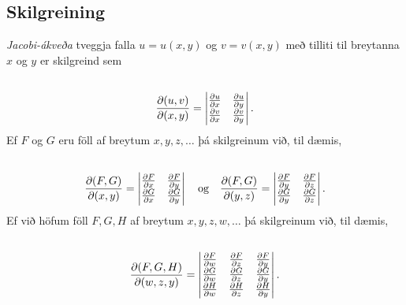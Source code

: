 \documentclass[a4paper,10pt,icelandic]{sphinxmanual}
\begin{document}
\subsection{Skilgreining}
\label{Kafli2:index-26}\label{Kafli2:id54}
\textit{Jacobi-ákveða} tveggja falla \(u=u(x,y)\) og \(v=v(x,y)\) með
tilliti til breytanna \(x\) og \(y\) er skilgreind sem
\begin{gather}
\begin{split}\displaystyle\end{split}\notag\\\begin{split}\frac{\partial(u,v)}{\partial(x,y)}=
\begin{vmatrix}
\frac{\partial u}{\partial x}&\frac{\partial u}{\partial y}\\
\frac{\partial v}{\partial x}&\frac{\partial v}{\partial y}
\end{vmatrix}.\end{split}\notag
\end{gather}
Ef \(F\) og \(G\) eru föll af breytum \(x,y,z,\ldots\) þá
skilgreinum við, til dæmis,
\begin{gather}
\begin{split}\displaystyle\end{split}\notag\\\begin{split}\frac{\partial(F,G)}{\partial(x,y)}=
\begin{vmatrix}
\frac{\partial F}{\partial x}&\frac{\partial F}{\partial y}\\
\frac{\partial G}{\partial x}&\frac{\partial G}{\partial y}
\end{vmatrix}\quad \mbox{og}\quad
\frac{\partial(F,G)}{\partial(y,z)}=
\begin{vmatrix}
\frac{\partial F}{\partial y}&\frac{\partial F}{\partial z}\\
\frac{\partial G}{\partial y}&\frac{\partial G}{\partial z}
\end{vmatrix}.\end{split}\notag
\end{gather}
Ef við höfum föll \(F, G, H\) af breytum \(x,y,z,w,\ldots\) þá
skilgreinum við, til dæmis,
\begin{gather}
\begin{split}\displaystyle\end{split}\notag\\\begin{split}\frac{\partial(F,G,H)}{\partial(w,z,y)}=
\begin{vmatrix}
\frac{\partial F}{\partial w}&\frac{\partial F}{\partial z}
&\frac{\partial F}{\partial y}\\
\frac{\partial G}{\partial w}&\frac{\partial G}{\partial z}
&\frac{\partial G}{\partial y}\\
\frac{\partial H}{\partial w}&\frac{\partial H}{\partial z}
&\frac{\partial H}{\partial y}
\end{vmatrix}.\end{split}\notag
\end{gather}
\end{document}

